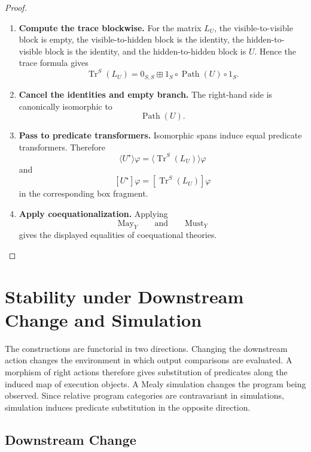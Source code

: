 \begin{proof}
\leavevmode
\begin{enumerate}
  \item \textbf{Compute the trace blockwise.}
  For the matrix \(L_U\), the visible-to-visible block is empty, the
  visible-to-hidden block is the identity, the hidden-to-visible block is the
  identity, and the hidden-to-hidden block is \(U\).  Hence the trace formula
  gives
  \[
    \operatorname{Tr}^S(L_U)
    =
    0_{S,S}
    \boxplus
    1_S\circ\operatorname{Path}(U)\circ 1_S.
  \]

  \item \textbf{Cancel the identities and empty branch.}
  The right-hand side is canonically isomorphic to
  \[
    \operatorname{Path}(U).
  \]

  \item \textbf{Pass to predicate transformers.}
  Isomorphic spans induce equal predicate transformers.  Therefore
  \[
    \langle U^\star\rangle\varphi
    =
    \langle\operatorname{Tr}^S(L_U)\rangle\varphi
  \]
  and
  \[
    [U^\star]\varphi
    =
    [\operatorname{Tr}^S(L_U)]\varphi
  \]
  in the corresponding box fragment.

  \item \textbf{Apply coequationalization.}
  Applying
  \[
    \mathrm{May}_Y
    \qquad
    \text{and}
    \qquad
    \mathrm{Must}_Y
  \]
  gives the displayed equalities of coequational theories.
\end{enumerate}
\end{proof}

\section{Stability under Downstream Change and Simulation}
\label{sec:stability-downstream-simulation-formal}

The constructions are functorial in two directions.  Changing the downstream
action changes the environment in which output comparisons are evaluated.  A
morphism of right actions therefore gives substitution of predicates along
the induced map of execution objects.  A Mealy simulation changes the program
being observed.  Since relative program categories are contravariant in
simulations, simulation induces predicate substitution in the opposite
direction.

\subsection{Downstream Change}
\label{subsec:downstream-change-formal}


